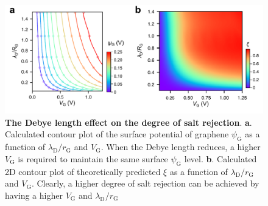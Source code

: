 \documentclass[journal=langd5,email=true, hyperref=true, keywords=false]{achemso}
\begin{document}
\begin{figure}[htbp]
  \centering
  \includegraphics[width=0.95\linewidth]{img/fig5.pdf}
  \caption{\textbf{The Debye length effect on the degree of salt
      rejection}. \textbf{a}. Calculated contour plot of the surface
    potential of graphene $\psi_{\mathrm{G}}$ as a function of
    $\lambda_{\mathrm{D}}/r_{\mathrm{G}}$ and $V_{\mathrm{G}}$. When
    the Debye length reduces, a higher $V_{\mathrm{G}}$ is required to
    maintain the same surface $\psi_{\mathrm{G}}$
    level. \textbf{b}. Calculated 2D contour plot of theoretically
    predicted $\xi$ as a function of
    $\lambda_{\mathrm{D}}/r_{\mathrm{G}}$ and
    $V_{\mathrm{G}}$. Clearly, a higher degree of salt rejection can
    be achieved by having a higher $V_{\mathrm{G}}$ and
    $\lambda_{\mathrm{D}}/r_{\mathrm{G}}$}
  \label{fig:5}
\end{figure}
\end{document}
